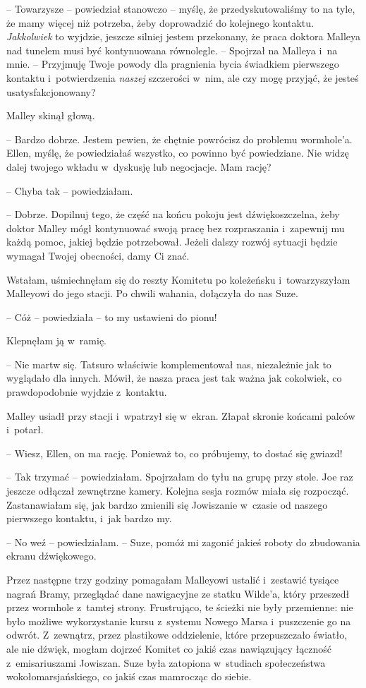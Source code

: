 \documentclass[oneside,polish,11pt,sfheadings]{mwbk}
\begin{document}
-- Towarzysze -- powiedział stanowczo -- myślę, że przedyskutowaliśmy to na
tyle, że mamy więcej niż potrzeba, żeby doprowadzić do kolejnego
kontaktu. \textit{Jakkolwiek} to wyjdzie, jeszcze silniej jestem
przekonany, że praca doktora Malleya nad tunelem musi być kontynuowana
równolegle. -- Spojrzał na Malleya i~na mnie. -- Przyjmuję Twoje powody
dla pragnienia bycia świadkiem pierwszego kontaktu i~potwierdzenia
\textit{naszej} szczerości w~nim, ale czy mogę przyjąć, że jesteś
usatysfakcjonowany?

Malley skinął głową.

-- Bardzo dobrze. Jestem pewien, że chętnie powrócisz do problemu
wormhole'a. Ellen, myślę, że powiedziałaś wszystko, co powinno być
powiedziane. Nie widzę dalej twojego wkładu w~dyskusję lub negocjacje.
Mam rację?

-- Chyba tak -- powiedziałam.

-- Dobrze. Dopilnuj tego, że część na końcu pokoju jest dźwiękoszczelna,
żeby doktor Malley mógł kontynuować swoją pracę bez rozpraszania i~zapewnij mu każdą pomoc, jakiej będzie potrzebował. Jeżeli dalszy rozwój
sytuacji będzie wymagał Twojej obecności, damy Ci znać.

Wstałam, uśmiechnęłam się do reszty Komitetu po koleżeńsku i~towarzyszyłam Malleyowi do jego stacji. Po chwili wahania, dołączyła do
nas Suze.

-- Cóż -- powiedziała -- to my ustawieni do pionu!

Klepnęłam ją w~ramię. 

-- Nie martw się. Tatsuro właściwie komplementował
nas, niezależnie jak to wyglądało dla innych. Mówił, że nasza praca jest
tak ważna jak cokolwiek, co prawdopodobnie wyjdzie z~kontaktu.

Malley usiadł przy stacji i~wpatrzył się w~ekran. Złapał skronie końcami
palców i~potarł. 

-- Wiesz, Ellen, on ma rację. Ponieważ to, co próbujemy,
to dostać się gwiazd!

-- Tak trzymać -- powiedziałam. Spojrzałam do tyłu na grupę przy stole.
Joe raz jeszcze odłączał zewnętrzne kamery. Kolejna sesja rozmów miała
się rozpocząć. Zastanawiałam się, jak bardzo zmienili się Jowiszanie w~czasie od naszego pierwszego kontaktu, i~jak bardzo my.

-- No weź -- powiedziałam. -- Suze, pomóż mi zagonić jakieś roboty do
zbudowania ekranu dźwiękowego.

Przez następne trzy godziny pomagałam Malleyowi ustalić i~zestawić
tysiące nagrań Bramy, przeglądać dane nawigacyjne ze statku Wilde'a,
który przeszedł przez wormhole z~tamtej strony. Frustrująco, te ścieżki
nie były przemienne: nie było możliwe wykorzystanie kursu z~systemu
Nowego Marsa i~puszczenie go na odwrót. Z~zewnątrz, przez plastikowe
oddzielenie, które przepuszczało światło, ale nie dźwięk, mogłam dojrzeć
Komitet co jakiś czas nawiązujący łączność z~emisariuszami Jowiszan.
Suze była zatopiona w~studiach społeczeństwa wokołomarsjańskiego, co
jakiś czas mamrocząc do siebie.
\end{document}
